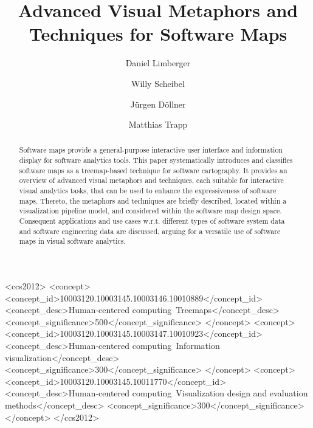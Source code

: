\documentclass[sigconf]{acmart}
\begin{document}
\title{Advanced Visual Metaphors and Techniques for Software Maps}

\author{Daniel Limberger}

\author{Willy Scheibel}

\author{J{\"u}rgen D{\"o}llner}

\author{Matthias Trapp}

\renewcommand{\shortauthors}{Limberger, Scheibel, D{\"o}llner, and Trapp}

\begin{abstract}
  Software maps provide a general-purpose interactive user interface and information display for software analytics tools.
  This paper systematically introduces and classifies software maps as a treemap-based technique for software cartography.
  It provides an overview of advanced visual metaphors and techniques, each suitable for interactive visual analytics tasks, that can be used to enhance the expressiveness of software maps.
  Thereto, the metaphors and techniques are briefly described, located within a visualization pipeline model, and considered within the software map design space.
  Consequent applications and use cases w.r.t. different types of software system data and software engineering data are discussed, arguing for a versatile use of software maps in visual software analytics.
\end{abstract}

\begin{CCSXML}
	<ccs2012>
	<concept>
	<concept_id>10003120.10003145.10003146.10010889</concept_id>
	<concept_desc>Human-centered computing~Treemaps</concept_desc>
	<concept_significance>500</concept_significance>
	</concept>
	<concept>
	<concept_id>10003120.10003145.10003147.10010923</concept_id>
	<concept_desc>Human-centered computing~Information visualization</concept_desc>
	<concept_significance>300</concept_significance>
	</concept>
	<concept>
	<concept_id>10003120.10003145.10011770</concept_id>
	<concept_desc>Human-centered computing~Visualization design and evaluation methods</concept_desc>
	<concept_significance>300</concept_significance>
	</concept>
	</ccs2012>
\end{CCSXML}
\end{document}
